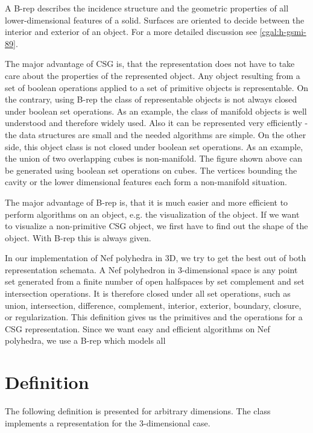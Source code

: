 A B-rep describes the incidence structure and the geometric properties of all
lower-dimensional features of a solid. Surfaces are oriented to decide
between the interior and exterior of an object. For a more detailed 
discussion see \ref{cgal:h-gsmi-89}. 

The major advantage of CSG is, that the representation does not have to
take care about the properties of the represented object. Any object
resulting from a set of boolean operations applied to a set of primitive
objects is representable. On the contrary, using B-rep the class of 
representable objects is not always closed under boolean set operations.
As an example, the class of manifold objects is well understood and 
therefore widely used. Also it can be represented very efficiently - 
the data structures are
small and the needed algorithms are simple. On the other side, this object
class is not closed under boolean set operations. As an example, the union of
two overlapping cubes is non-manifold. The figure shown above
can be generated using boolean set operations on cubes. The vertices bounding
the cavity or the lower dimensional features each form a non-manifold situation.

The major advantage of B-rep is, that it is much easier and more efficient to
perform algorithms on an object, e.g. the visualization of the object. If we
want to visualize a non-primitive CSG object, we first have to find out the 
shape of the object. With B-rep this is always given.

In our implementation of Nef polyhedra in 3D, we try to get the best out of
both representation schemata. A Nef polyhedron in 3-dimensional space is
any point set generated from a finite number of open halfspaces by set
complement and set intersection operations. It is therefore closed under all
set operations, such as union, intersection, difference, complement, interior,
exterior, boundary, closure, or regularization. This definition gives us the
primitives and the operations for a CSG representation. Since we want easy
and efficient algorithms on Nef polyhedra, we use a B-rep which models
all  


\section{Definition}

The following definition is presented
for arbitrary dimensions. The class  implements a
representation for the 3-dimensional case.

